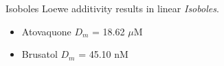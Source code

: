 \documentclass{beamer}
\begin{document}
\begin{frame}{Isoboles}
    Loewe additivity results in linear \textit{Isoboles}.
    \begin{itemize}
        \item Atovaquone $D_m$ = 18.62 $\mu$M
        \item Brusatol $D_m$ = 45.10 nM
    \end{itemize}
    \begin{center}
    \end{center}

\end{frame}
\end{document}
